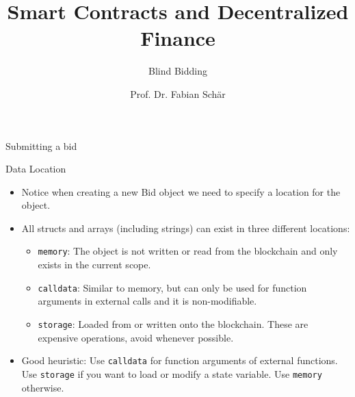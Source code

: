 \documentclass[]{beamer}
\title{Smart Contracts and Decentralized Finance}
\subtitle{Blind Bidding}
\author{Prof. Dr. Fabian Sch\"ar}
\institute{University of Basel}
\begin{document}
\thispagestyle{empty}
\begin{frame}[noframenumbering]
	\titlepage
\end{frame}

\begin{frame}{Submitting a bid}
\vspace{.3cm}

\end{frame}

\begin{frame}{Data Location}
	\begin{itemize}
		\item Notice when creating a new Bid object we need to specify a location for the object.
		\item<2-> All structs and arrays (including strings) can exist in three different locations:
			\begin{itemize}
			\item<3-> \texttt{memory}: The object is not written or read from the blockchain and only exists in the current scope.
			\item<4-> \texttt{calldata}: Similar to memory, but can only be used for function arguments in external calls and it is non-modifiable.
			\item<5-> \texttt{storage}: Loaded from or written onto the blockchain. These are expensive operations, avoid whenever possible.
			\end{itemize}

		\item<6-> Good heuristic: Use \texttt{calldata} for function arguments of external functions. Use \texttt{storage} if you want to load or modify a state variable. Use \texttt{memory} otherwise.
		\end{itemize}
\end{frame}
\end{document}

